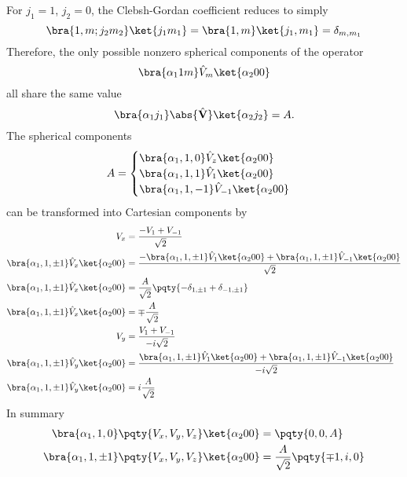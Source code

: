 \documentclass[12pt]{article}
\begin{document}
        \subsubsection{} For \(j_1 = 1\), \(j_2 = 0\), the Clebsh-Gordan coefficient reduces to simply \[
            \bra{1,m;j_2m_2} \ket{j_1m_1} = \bra{1,m} \ket{j_1,m_1} = \delta_{m,m_1}
        \]
        Therefore, the only possible nonzero spherical components of the operator  \[
            \bra{\alpha_1 1m} \hat{V}_m \ket{\alpha_2 00}
        \]
        all share the same value
        \[
            \bra{\alpha_1j_1} \abs{\hat{\bf V}} \ket{\alpha_2j_2} = A.
        \]
        The spherical components \begin{align*}
            A =\begin{cases}  
                \bra{\alpha_1, 1,0} \hat{V}_z \ket{\alpha_2 00} \\
                \bra{\alpha_1, 1,1} \hat{V}_1 \ket{\alpha_2 00} \\
                \bra{\alpha_1, 1, -1} \hat{V}_{ - 1} \ket{\alpha_2 00} \\
            \end{cases} 
        \end{align*}
        can be transformed into Cartesian components by \begin{align*}
            V_x &= \frac{ -V_1 + V_{ - 1}}{\sqrt{2}} \\
            \bra{\alpha_1, 1, \pm 1} \hat{V}_x \ket{\alpha_2 00} &= \frac{ -\bra{\alpha_1, 1,\pm 1} \hat{V}_1 \ket{\alpha_2 00} + \bra{\alpha_1, 1, \pm 1} \hat{V}_{ -1} \ket{\alpha_2 00}}{\sqrt{2}} \\
            \bra{\alpha_1, 1, \pm 1} \hat{V}_x \ket{\alpha_2 00} &= \frac{A}{\sqrt{2}} \pqty{ -\delta_{1,\pm 1} + \delta_{ - 1,\pm 1}}\\
            \bra{\alpha_1, 1, \pm 1} \hat{V}_x \ket{\alpha_2 00} &= \mp \frac{A}{\sqrt{2}} \\
            V_y &= \frac{V_1 + V_{ - 1}}{ - i \sqrt{2}} \\
            \bra{\alpha_1, 1, \pm 1} \hat{V}_y \ket{\alpha_2 00} &= \frac{ \bra{\alpha_1, 1,\pm 1} \hat{V}_1 \ket{\alpha_2 00} + \bra{\alpha_1, 1, \pm 1} \hat{V}_{ -1} \ket{\alpha_2 00}}{ - i\sqrt{2}} \\
            \bra{\alpha_1, 1, \pm 1} \hat{V}_y \ket{\alpha_2 00} &= i\frac{A}{\sqrt{2}} 
        \end{align*}
        In summary \begin{align*}
            \bra{\alpha_1, 1, 0} \pqty{V_x,V_y,V_z} \ket{\alpha_2 00} &= \pqty{0,0,A}\\
            \bra{\alpha_1, 1, \pm 1} \pqty{V_x,V_y,V_z} \ket{\alpha_2 00} &= \frac{A}{\sqrt{2}} \pqty{\mp 1, i, 0}
        \end{align*}
\end{document}
